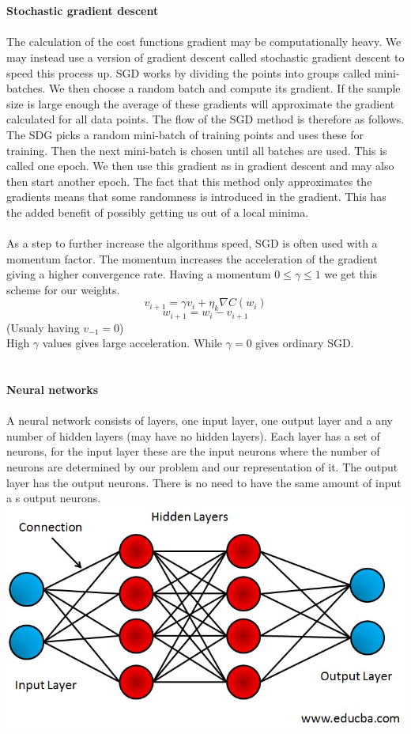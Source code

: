 \documentclass[12pt, letterpaper, twoside]{article}
\begin{document}
\ \\
\ \\
\textbf{Stochastic gradient descent}\\
\ \\
The calculation of the cost functions gradient may be computationally heavy. We may instead use a version of gradient descent called stochastic gradient descent to speed this process up. SGD works by dividing the points into groups called mini-batches. We then choose a random batch and compute its gradient. If the sample size is large enough the average of these gradients will approximate the gradient calculated for all data points. The flow of the SGD method is therefore as follows. The SDG picks a random mini-batch of training points and uses these for training. Then the next mini-batch is chosen until all batches are used. This is called one epoch. We then use this gradient as in gradient descent and may also then start another epoch. The fact that this method only approximates the gradients means that some randomness is introduced in the gradient. This has the added benefit of possibly getting us out of a local minima.\\
\ \\
As a step to further increase the algorithms speed, SGD is often used with a momentum factor. The momentum increases the acceleration of the gradient giving a higher convergence rate. Having a momentum $0 \leq \gamma \leq 1$ we get this scheme for our weights.
$$
v_{i+1} = \gamma v_i + \eta_k \nabla C(w_i)
$$
$$
w_{i+1} = w_i - v_{i+1}
$$
(Usualy having $v_{-1} = 0$)\\
High $\gamma$ values gives large acceleration. While $\gamma = 0$ gives ordinary SGD.\\
\ \\
\ \\
\textbf{Neural networks}\\
\ \\
A neural network consists of layers, one input layer, one output layer and a any number of hidden layers (may have no hidden layers).
Each layer has a set of neurons, for the input layer these are the input neurons where the number of neurons are determined by our problem and our representation of it. The output layer has the output neurons. There is no need to have the same amount of input a s output neurons.\\
\includegraphics[scale=0.5]{"NN"}\\
\end{document}

